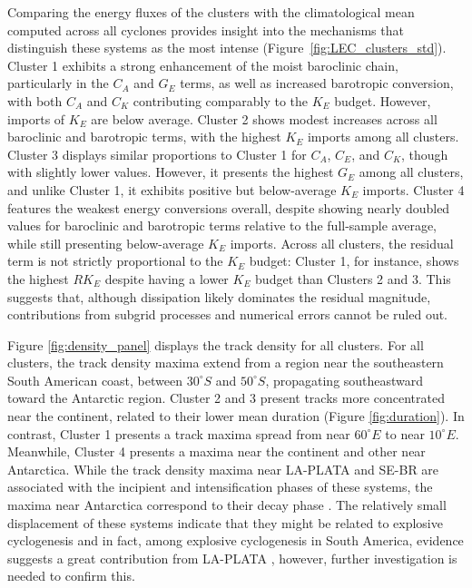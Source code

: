 \documentclass[pdflatex,sn-chicago]{sn-jnl}%
\theoremstyle{plain}
\theoremstyle{definition}
\theoremstyle{remark}
\theoremstyle{definition}
\begin{document}
Comparing the energy fluxes of the clusters with the climatological mean computed across all cyclones provides insight into the mechanisms that distinguish these systems as the most intense (Figure~\ref{fig:LEC_clusters_std}). Cluster 1 exhibits a strong enhancement of the moist baroclinic chain, particularly in the \(C_A\) and \(G_E\) terms, as well as increased barotropic conversion, with both \(C_A\) and \(C_K\) contributing comparably to the \(K_E\) budget. However, imports of \(K_E\) are below average. Cluster 2 shows modest increases across all baroclinic and barotropic terms, with the highest \(K_E\) imports among all clusters. Cluster 3 displays similar proportions to Cluster 1 for \(C_A\), \(C_E\), and \(C_K\), though with slightly lower values. However, it presents the highest \(G_E\) among all clusters, and unlike Cluster 1, it exhibits positive but below-average \(K_E\) imports. Cluster 4 features the weakest energy conversions overall, despite showing nearly doubled values for baroclinic and barotropic terms relative to the full-sample average, while still presenting below-average \(K_E\) imports. Across all clusters, the residual term is not strictly proportional to the \(K_E\) budget: Cluster 1, for instance, shows the highest \(RK_E\) despite having a lower \(K_E\) budget than Clusters 2 and 3. This suggests that, although dissipation likely dominates the residual magnitude, contributions from subgrid processes and numerical errors cannot be ruled out.


Figure \ref{fig:density_panel} displays the track density for all clusters. For all clusters, the track density maxima extend from a region near the southeastern South American coast, between $30^\circ S$ and $50^\circ S$, propagating southeastward toward the Antarctic region. Cluster 2 and 3 present tracks more concentrated near the continent, related to their lower mean duration (Figure \ref{fig:duration}). In contrast, Cluster 1 presents a track maxima spread from near $60^{\circ} E$ to near $10^{\circ} E$. Meanwhile, Cluster 4 presents a maxima near the continent and other near Antarctica.  While the track density maxima near LA-PLATA and SE-BR are associated with the incipient and intensification phases of these systems, the maxima near Antarctica correspond to their decay phase \citep{couto2024new}. The relatively small displacement of these systems indicate that they might be related to explosive cyclogenesis and in fact, among explosive cyclogenesis in South America, evidence suggests a great contribution from LA-PLATA \citep{andrade2024explosive, andrade2025composite}, however, further investigation is needed to confirm this.
\end{document}
